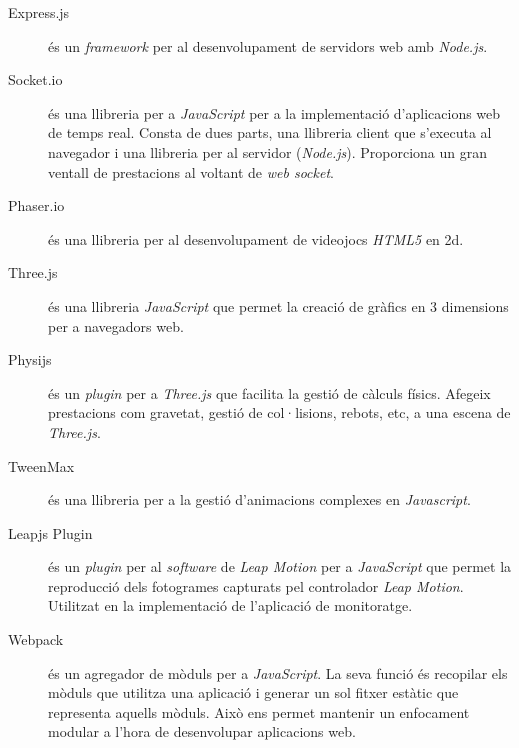 \documentclass[12pt,a4paper,catalan]{article}
\begin{document}
	\begin{description}
		\item[Express.js] és un \textit{framework} per al desenvolupament de servidors web amb \textit{Node.js}.
		\item[Socket.io] és una llibreria per a \textit{JavaScript} per a la implementació d'aplicacions web de temps real. Consta de dues parts, una llibreria client que s'executa al navegador i una llibreria per al servidor (\textit{Node.js}). Proporciona un gran ventall de prestacions al voltant de \textit{web socket}.
		\item[Phaser.io] és una llibreria per al desenvolupament de videojocs \textit{HTML5} en 2d.
		\item[Three.js] és una llibreria \textit{JavaScript} que permet la creació de gràfics en 3 dimensions per a navegadors web.
		\item[Physijs] és un \textit{plugin} per a \textit{Three.js} que facilita la gestió de càlculs físics. Afegeix prestacions com gravetat, gestió de col·lisions, rebots, etc, a una escena de \textit{Three.js}.
		\item[TweenMax] és una llibreria per a la gestió d'animacions complexes en \textit{Javascript}.
		\item[Leapjs Plugin] és un \textit{plugin} per al \textit{software} de \textit{Leap Motion} per a \textit{JavaScript} que permet la reproducció dels fotogrames capturats pel controlador \textit{Leap Motion}. Utilitzat en la implementació de l'aplicació de monitoratge.
		\item[Webpack] és un agregador de mòduls per a \textit{JavaScript}. La seva funció és recopilar els mòduls que utilitza una aplicació i generar un sol fitxer estàtic que representa aquells mòduls. Això ens permet mantenir un enfocament modular a l'hora de desenvolupar aplicacions web.
	\end{description}
\end{document}
